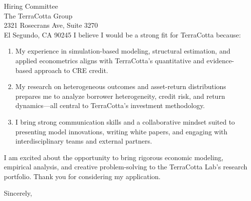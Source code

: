 \documentclass[11pt,letterpaper]{letter}
\begin{document}
\begin{letter}{Hiring Committee \\
The TerraCotta Group \\
2321 Rosecrans Ave, Suite 3270 \\
El Segundo, CA 90245}
I believe I would be a strong fit for TerraCotta because:
\begin{enumerate}
    \item My experience in simulation-based modeling, structural estimation, and applied econometrics aligns with TerraCotta’s quantitative and evidence-based approach to CRE credit.
    \item My research on heterogeneous outcomes and asset-return distributions prepares me to analyze borrower heterogeneity, credit risk, and return dynamics—all central to TerraCotta’s investment methodology.
    \item I bring strong communication skills and a collaborative mindset suited to presenting model innovations, writing white papers, and engaging with interdisciplinary teams and external partners.
\end{enumerate}

I am excited about the opportunity to bring rigorous economic modeling, empirical analysis, and creative problem-solving to the TerraCotta Lab’s research portfolio. Thank you for considering my application.

\closing{Sincerely,}

\end{letter}
\end{document}
